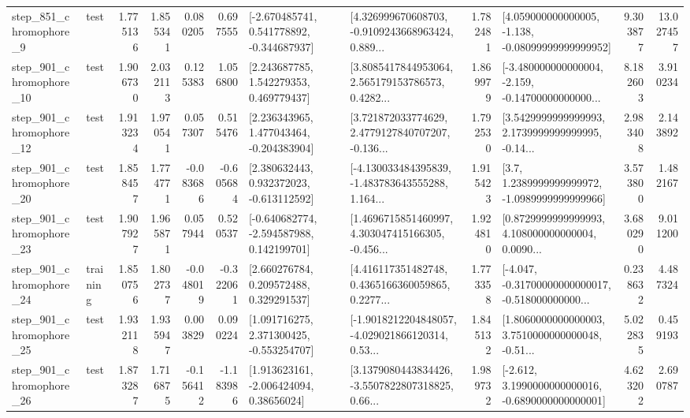 \begin{tabular}{llrrrrllrlrr}
   step\_851\_chromophore\_9 &      test &      1.775136 &    1.855341 &      0.080205 &  0.697555 &   [-2.670485741, 0.541778892, -0.344687937] &  [4.326999670608703, -0.9109243668963424, 0.889... &       1.782481 &  [4.059000000000005, -1.138, -0.08099999999999952] &            9.303877 &         13.027457 \\
  step\_901\_chromophore\_10 &      test &      1.906730 &    2.032113 &      0.125383 &  1.056800 &     [2.243687785, 1.542279353, 0.469779437] &  [3.8085417844953064, 2.565179153786573, 0.4282... &       1.869979 &  [-3.480000000000004, -2.159, -0.14700000000000... &            8.182603 &          3.910234 \\
  step\_901\_chromophore\_12 &      test &      1.913234 &    1.970541 &      0.057307 &  0.515476 &    [2.236343965, 1.477043464, -0.204383904] &  [3.721872033774629, 2.4779127840707207, -0.136... &       1.792530 &  [3.5429999999999993, 2.1739999999999995, -0.14... &            2.983408 &          2.143892 \\
  step\_901\_chromophore\_20 &      test &      1.858457 &    1.774771 &     -0.083686 & -0.605684 &    [2.380632443, 0.932372023, -0.613112592] &  [-4.130033484395839, -1.483783643555288, 1.164... &       1.915423 &     [3.7, 1.2389999999999972, -1.0989999999999966] &            3.573800 &          1.482167 \\
  step\_901\_chromophore\_23 &      test &      1.907927 &    1.965871 &      0.057944 &  0.520537 &   [-0.640682774, -2.594587988, 0.142199701] &  [1.4696715851460997, 4.303047415166305, -0.456... &       1.924810 &  [0.8729999999999993, 4.108000000000004, 0.0090... &            3.680290 &          9.011200 \\
  step\_901\_chromophore\_24 &  training &      1.850756 &    1.802737 &     -0.048019 & -0.322061 &     [2.660276784, 0.209572488, 0.329291537] &  [4.416117351482748, 0.4365166360059865, 0.2277... &       1.773358 &  [-4.047, -0.31700000000000017, -0.518000000000... &            0.238632 &          4.487324 \\
  step\_901\_chromophore\_25 &      test &      1.932118 &    1.935947 &      0.003829 &  0.090224 &    [1.091716275, 2.371300425, -0.553254707] &  [-1.9018212204848057, -4.029021866120314, 0.53... &       1.845132 &  [1.8060000000000003, 3.7510000000000048, -0.51... &            5.022835 &          0.459193 \\
  step\_901\_chromophore\_26 &      test &      1.873287 &    1.716875 &     -0.156412 & -1.183986 &     [1.913623161, -2.006424094, 0.38656024] &  [3.1379080443834426, -3.5507822807318825, 0.66... &       1.989732 &  [-2.612, 3.1990000000000016, -0.6890000000000001] &            4.623202 &          2.690787 \\

\end{tabular}
